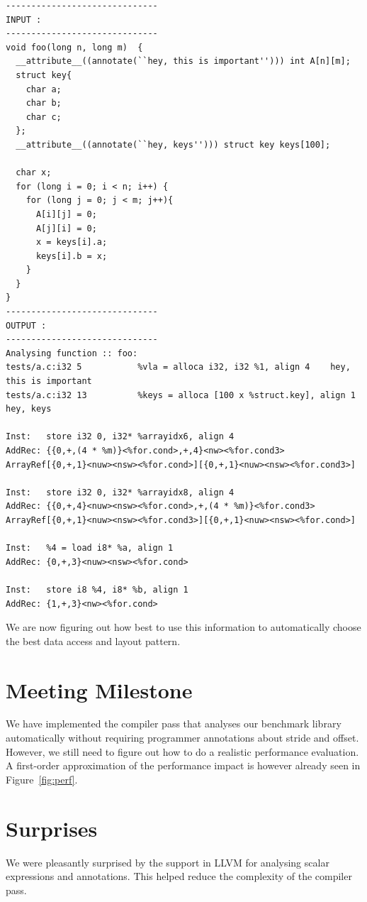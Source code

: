 \documentclass[letterpaper]{article}
\begin{document}
\begin{Verbatim}[fontsize=\small]
------------------------------
INPUT :
------------------------------
void foo(long n, long m)  {
  __attribute__((annotate(``hey, this is important''))) int A[n][m];
  struct key{
    char a;
    char b;
    char c;
  };
  __attribute__((annotate(``hey, keys''))) struct key keys[100];

  char x;
  for (long i = 0; i < n; i++) {
    for (long j = 0; j < m; j++){
      A[i][j] = 0;
      A[j][i] = 0;
      x = keys[i].a;
      keys[i].b = x;
    }
  }
}
------------------------------
OUTPUT :
------------------------------
Analysing function :: foo:
tests/a.c:i32 5           %vla = alloca i32, i32 %1, align 4    hey, this is important
tests/a.c:i32 13          %keys = alloca [100 x %struct.key], align 1   hey, keys

Inst:   store i32 0, i32* %arrayidx6, align 4
AddRec: {{0,+,(4 * %m)}<%for.cond>,+,4}<nw><%for.cond3>
ArrayRef[{0,+,1}<nuw><nsw><%for.cond>][{0,+,1}<nuw><nsw><%for.cond3>]

Inst:   store i32 0, i32* %arrayidx8, align 4
AddRec: {{0,+,4}<nuw><nsw><%for.cond>,+,(4 * %m)}<%for.cond3>
ArrayRef[{0,+,1}<nuw><nsw><%for.cond3>][{0,+,1}<nuw><nsw><%for.cond>]

Inst:   %4 = load i8* %a, align 1
AddRec: {0,+,3}<nuw><nsw><%for.cond>

Inst:   store i8 %4, i8* %b, align 1
AddRec: {1,+,3}<nw><%for.cond>
\end{Verbatim}

We are now figuring out how best to use this information to automatically
choose the best data access and layout pattern.

\section{Meeting Milestone}

We have implemented the compiler pass that analyses our benchmark library automatically without requiring
programmer annotations about stride and offset. However, we still need to figure out how to do
a realistic performance evaluation. A first-order approximation of the performance impact is
however already seen in Figure~\ref{fig:perf}. 

\section{Surprises}

We were pleasantly surprised by the support in LLVM for analysing scalar expressions and annotations.
This helped reduce the complexity of the compiler pass.
\end{document}

